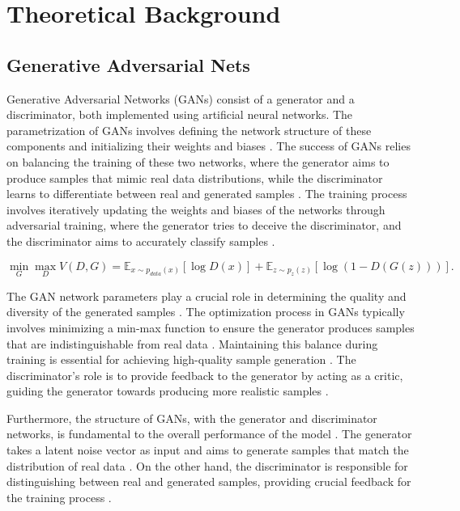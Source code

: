 \chapter{Theoretical Background}
\label{Theoretical Background}

\section*{Generative Adversarial Nets}

Generative Adversarial Networks (GANs) consist of a generator and a discriminator, 
both implemented using artificial neural networks. The parametrization of GANs involves 
defining the network structure of these components and initializing their weights and biases \citep{10.1007/s10928-021-09787-4}. 
The success of GANs relies on balancing the training of these two networks, where the 
generator aims to produce samples that mimic real data distributions, while the discriminator 
learns to differentiate between real and generated samples \citep{10.1109/taslp.2017.2761547}. 
The training process involves iteratively updating the weights and biases of the networks through 
adversarial training, where the generator tries to deceive the discriminator, and the discriminator 
aims to accurately classify samples \citep{10.48550/arxiv.1802.05637}.

\begin{equation}
    \min_{G} \max_{D} V(D, G) = \mathbb{E}_{x \sim p_{data}(x)} [\log D(x)] + \mathbb{E}_{z \sim p_{z}(z)} [\log(1 - D(G(z)))].
\end{equation}

The GAN network parameters play a crucial role in determining the quality and diversity of 
the generated samples \citep{10.1007/s10928-021-09787-4}. The optimization process in GANs 
typically involves minimizing a min-max function to ensure the generator produces samples that 
are indistinguishable from real data \citep{10.1109/taslp.2017.2761547}. Maintaining this balance 
during training is essential for achieving high-quality sample generation \citep{10.1007/s10928-021-09787-4}. 
The discriminator's role is to provide feedback to the generator by acting as a critic, 
guiding the generator towards producing more realistic samples \citep{10.48550/arxiv.1802.05637}.

Furthermore, the structure of GANs, with the generator and discriminator networks, is fundamental to the overall performance of the model \citep{10.1109/taslp.2017.2761547}. The generator takes a latent noise vector as input and aims to generate samples that match the distribution of real data \citep{10.48550/arxiv.1908.05861}. On the other hand, the discriminator is responsible for distinguishing between real and generated samples, providing crucial feedback for the training process \citep{10.1002/mp.14062}.

